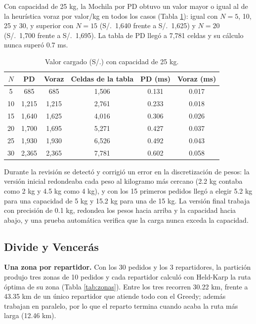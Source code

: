 Con capacidad de 25 kg, la Mochila por PD obtuvo un valor mayor o igual al de la heurística voraz por valor/kg en todos los casos (Tabla \ref{tab:mochila}): igual con $N=5$, 10, 25 y 30, y superior con $N=15$ (S/.~1,640 frente a S/.~1,625) y $N=20$ (S/.~1,700 frente a S/.~1,695). La tabla de PD llegó a 7,781 celdas y su cálculo nunca superó 0.7 ms.

\begin{table}[h]
    \centering
    \caption{Valor cargado (S/.) con capacidad de 25 kg.}
    \label{tab:mochila}
    \begin{tabular}{cccccc}
        \toprule
        $N$ & \textbf{PD} & \textbf{Voraz} & \textbf{Celdas de la tabla} & \textbf{PD (ms)} & \textbf{Voraz (ms)} \\
        \midrule
        5  & 685   & 685   & 1{,}506 & 0.131 & 0.017 \\
        10 & 1{,}215 & 1{,}215 & 2{,}761 & 0.233 & 0.018 \\
        15 & 1{,}640 & 1{,}625 & 4{,}016 & 0.306 & 0.026 \\
        20 & 1{,}700 & 1{,}695 & 5{,}271 & 0.427 & 0.037 \\
        25 & 1{,}930 & 1{,}930 & 6{,}526 & 0.492 & 0.043 \\
        30 & 2{,}365 & 2{,}365 & 7{,}781 & 0.602 & 0.058 \\
        \bottomrule
    \end{tabular}
\end{table}

Durante la revisión se detectó y corrigió un error en la discretización de pesos: la versión inicial redondeaba cada peso al kilogramo más cercano (2.2 kg contaba como 2 kg y 4.5 kg como 4 kg), y con los 15 primeros pedidos llegó a elegir 5.2 kg para una capacidad de 5 kg y 15.2 kg para una de 15 kg. La versión final trabaja con precisión de 0.1 kg, redondea los pesos hacia arriba y la capacidad hacia abajo, y una prueba automática verifica que la carga nunca exceda la capacidad.

\subsection{Divide y Vencerás}

\textbf{Una zona por repartidor.} Con los 30 pedidos y los 3 repartidores, la partición produjo tres zonas de 10 pedidos y cada repartidor calculó con Held-Karp la ruta óptima de su zona (Tabla \ref{tab:zonas}). Entre los tres recorren 30.22 km, frente a 43.35 km de un único repartidor que atiende todo con el Greedy; además trabajan en paralelo, por lo que el reparto termina cuando acaba la ruta más larga (12.46 km).

